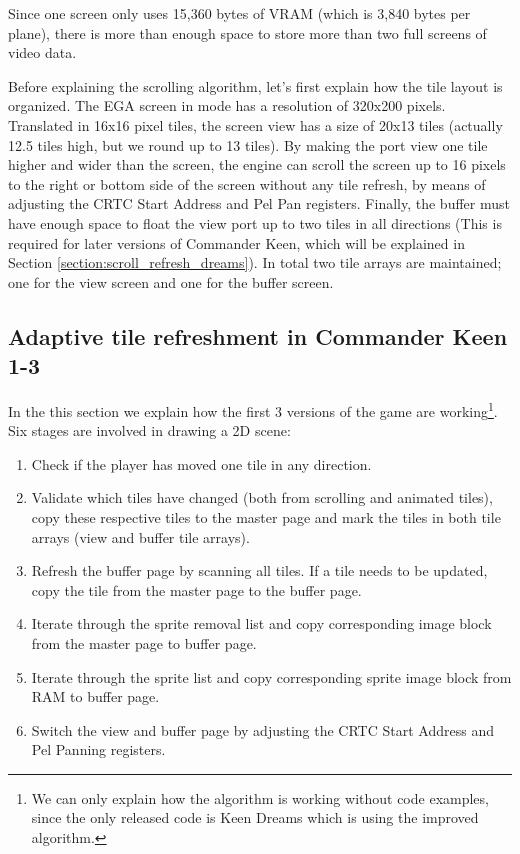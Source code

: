 \documentclass[book.tex]{subfiles}
\begin{document}
Since one screen only uses 15,360 bytes of VRAM (which is 3,840 bytes per plane), there is more than enough space to store more than two full screens of video data. 

\par
Before explaining the scrolling algorithm, let's first explain how the tile layout is organized. The EGA screen in mode  has a resolution of 320x200 pixels. Translated in 16x16 pixel tiles, the screen view has a size of 20x13 tiles (actually 12.5 tiles high, but we round up to 13 tiles). By making the port view one tile higher and wider than the screen, the engine can scroll the screen up to 16 pixels to the right or bottom side of the screen without any tile refresh, by means of adjusting the CRTC Start Address and Pel Pan registers. Finally, the buffer must have enough space to float the view port up to two tiles in all directions (This is required for later versions of Commander Keen, which will be explained in Section \ref{section:scroll_refresh_dreams}). In total two tile arrays are maintained; one for the view screen and one for the buffer screen.\\
\par
 






\subsection{Adaptive tile refreshment in Commander Keen 1-3}
In the this section we explain how the first 3 versions of the game are working\footnote{We can only explain how the algorithm is working without code examples, since the only released code is Keen Dreams which is using the improved algorithm.}. Six stages are involved in drawing a 2D scene:
\begin{enumerate}
\item Check if the player has moved one tile in any direction.
\item Validate which tiles have changed (both from scrolling and animated tiles), copy these respective tiles to the master page and mark the tiles in both tile arrays (view and buffer tile arrays).
\item Refresh the buffer page by scanning all tiles. If a tile needs to be updated, copy the tile from the master page to the buffer page.
\item Iterate through the sprite removal list and copy corresponding image block from the master page to buffer page. 
\item Iterate through the sprite list and copy corresponding sprite image block from RAM to buffer page.
\item Switch the view and buffer page by adjusting the CRTC Start Address and Pel Panning registers.
\end{enumerate}
\end{document}
